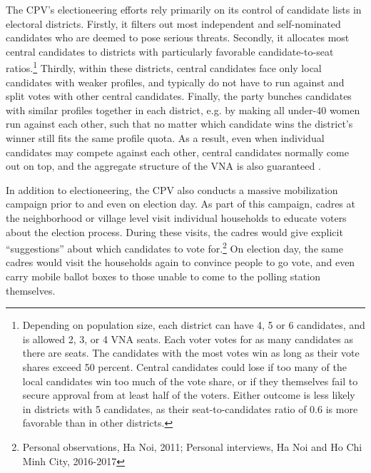 \documentclass[12pt]{article}
\newcommand\fnote[1]{\footnote{\baselineskip=2\normalbaselineskip#1}}
\newcommand{\1}{\mathbbm{1}}
\begin{document}
The CPV's electioneering efforts rely primarily on its control of candidate lists in electoral districts. Firstly, it filters out most independent and self-nominated candidates who are deemed to pose serious threats. Secondly, it allocates most central candidates to districts with particularly favorable candidate-to-seat ratios.\fnote{Depending on population size, each district can have 4, 5 or 6 candidates, and is allowed 2, 3, or 4 VNA seats. Each voter votes for as many candidates as there are seats. The candidates with the most votes win as long as their vote shares exceed 50 percent. Central candidates could lose if too many of the local candidates win too much of the vote share, or if they themselves fail to secure approval from at least half of the voters. Either outcome is less likely in districts with 5 candidates, as their seat-to-candidates ratio of $0.6$ is more favorable than in other districts.} Thirdly, within these districts, central candidates face only local candidates with weaker profiles, and typically do not have to run against and split votes with other central candidates. Finally, the party bunches candidates with similar profiles together in each district, e.g. by making all under-40 women run against each other, such that no matter which candidate wins the district's winner still fits the same profile quota. As a result, even when individual candidates may compete against each other, central candidates normally come out on top, and the aggregate structure of the VNA is also guaranteed \citep{MaleskySchuler2011}. 

In addition to electioneering, the CPV also conducts a massive mobilization campaign prior to and even on election day. As part of this campaign, cadres at the neighborhood or village level visit individual households to educate voters about the election process. During these visits, the cadres would give explicit ``suggestions'' about which candidates to vote for.\fnote{Personal observations, Ha Noi, 2011; Personal interviews, Ha Noi and Ho Chi Minh City, 2016-2017} On election day, the same cadres would visit the households again to convince people to go vote, and even carry mobile ballot boxes to those unable to come to the polling station themselves.
\end{document}
